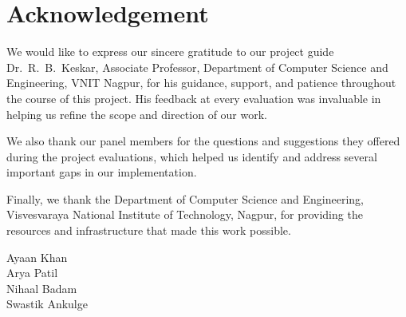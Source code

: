 \chapter*{Acknowledgement}

We would like to express our sincere gratitude to our project guide Dr.\ R.\ B.\
Keskar, Associate Professor, Department of Computer Science and Engineering, VNIT
Nagpur, for his guidance, support, and patience throughout the course of this
project. His feedback at every evaluation was invaluable in helping us refine the
scope and direction of our work.

We also thank our panel members for the questions and suggestions they offered
during the project evaluations, which helped us identify and address several
important gaps in our implementation.

Finally, we thank the Department of Computer Science and Engineering, Visvesvaraya
National Institute of Technology, Nagpur, for providing the resources and
infrastructure that made this work possible.

\vspace{2cm}

\begin{flushright}
Ayaan Khan\\
Arya Patil\\
Nihaal Badam\\
Swastik Ankulge
\end{flushright}
